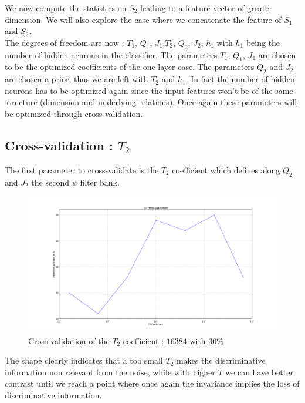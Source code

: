 \documentclass[a4paper]{report}
\begin{document}
We now compute the statistics on $S_2$ leading to a feature vector of greater dimension. We will also explore the case where we concatenate the feature of $S_1$ and $S_2$.
\\
The degrees of freedom are now : $T_1$, $Q_1$, $J_1$,$T_2$, $Q_2$, $J_2$, $h_1$ with $h_1$ being the number of hidden neurons in the classifier.
The parameters $T_1$, $Q_1$, $J_1$ are chosen to be the optimized coefficients of the one-layer case. The parameters $Q_2$ and $J_2$ are chosen a priori thus we are left with $T_2$ and $h_1$. In fact the number of hidden neurons has to be optimized again since the input features won't be of the same structure (dimension and underlying relations). Once again these parameters will be optimized through cross-validation.

\subsection{Cross-validation : $T_2$}
The first parameter to cross-validate is the $T_2$ coefficient which defines along $Q_2$ and $J_2$ the second $\psi$ filter bank.
\begin{figure}[H]
\begin{center}
\includegraphics[scale=0.20]{cross_T2.png}\caption{Cross-validation of the $T_2$ coefficient : $16384$ with $30\%$}\label{figure4}
\end{center}
\end{figure}
The shape clearly indicates that a too small $T_2$ makes the discriminative information non relevant from the noise, while with higher $T$ we can have better contrast until we reach a point where once again the invariance implies the loss of discriminative information.
\end{document}
